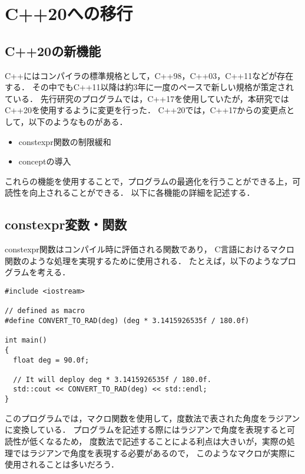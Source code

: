 ﻿%

\chapter{C++20への移行}\label{chapter:付録A}
\section{C++20の新機能}
C++にはコンパイラの標準規格として，C++98，C++03，C++11などが存在する．
その中でもC++11以降は約3年に一度のペースで新しい規格が策定されている．
先行研究のプログラムでは，C++17を使用していたが，本研究ではC++20を使用するように変更を行った．
C++20では，C++17からの変更点として，以下のようなものがある．
\begin{itemize}
  \item constexpr関数の制限緩和
  \item conceptの導入
\end{itemize}
これらの機能を使用することで，プログラムの最適化を行うことができる上，可読性を向上されることができる．
以下に各機能の詳細を記述する．

\section{constexpr変数・関数}
constexpr関数はコンパイル時に評価される関数であり，
C言語におけるマクロ関数のような処理を実現するために使用される．
たとえば，以下のようなプログラムを考える．

\begin{lstlisting}[caption=convert func as macro,label=convert_func_as_macro]
#include <iostream>

// defined as macro
#define CONVERT_TO_RAD(deg) (deg * 3.1415926535f / 180.0f)  

int main()
{
  float deg = 90.0f;
  
  // It will deploy deg * 3.1415926535f / 180.0f.
  std::cout << CONVERT_TO_RAD(deg) << std::endl;
}
\end{lstlisting}

このプログラムでは，マクロ関数を使用して，度数法で表された角度をラジアンに変換している．
プログラムを記述する際にはラジアンで角度を表現すると可読性が低くなるため，
度数法で記述することによる利点は大きいが，実際の処理ではラジアンで角度を表現する必要があるので，
このようなマクロが実際に使用されることは多いだろう．

